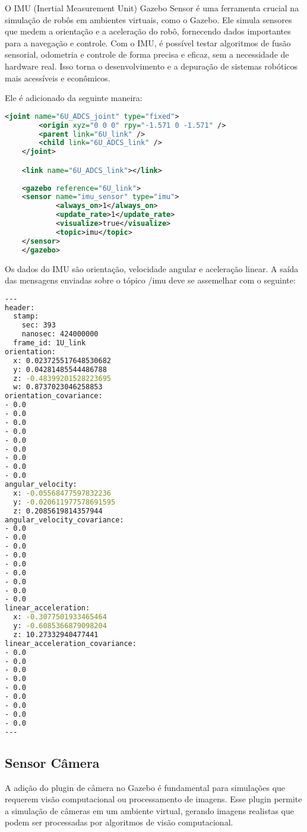 O IMU (Inertial Measurement Unit) Gazebo Sensor é uma ferramenta crucial na simulação de robôs em ambientes virtuais, como o Gazebo. Ele simula sensores que medem a orientação e a aceleração do robô, fornecendo dados importantes para a navegação e controle. Com o IMU, é possível testar algoritmos de fusão sensorial, odometria e controle de forma precisa e eficaz, sem a necessidade de hardware real. Isso torna o desenvolvimento e a depuração de sistemas robóticos mais acessíveis e econômicos.

Ele é adicionado da seguinte maneira:

\begin{lstlisting}[language=XML,caption={XML version}]
    <joint name="6U_ADCS_joint" type="fixed">
        <origin xyz="0 0 0" rpy="-1.571 0 -1.571" />
        <parent link="6U_link" />
        <child link="6U_ADCS_link" />
    </joint>

    <link name="6U_ADCS_link"></link>
    
    <gazebo reference="6U_link">
	<sensor name="imu_sensor" type="imu">
    		<always_on>1</always_on>
    		<update_rate>1</update_rate>
    		<visualize>true</visualize>
    		<topic>imu</topic>
	</sensor>
    </gazebo>
\end{lstlisting}

Os dados do IMU são orientação, velocidade angular e aceleração linear. A saída das mensagens enviadas sobre o tópico /imu deve se assemelhar com o seguinte:

\begin{lstlisting}[language=bash,caption={Bash version}]
    ---
header:
  stamp:
    sec: 393
    nanosec: 424000000
  frame_id: 1U_link
orientation:
  x: 0.023725517648530682
  y: 0.04281485544486788
  z: -0.48399201528223695
  w: 0.8737023046258853
orientation_covariance:
- 0.0
- 0.0
- 0.0
- 0.0
- 0.0
- 0.0
- 0.0
- 0.0
- 0.0
angular_velocity:
  x: -0.05568477597832236
  y: -0.020611977578691595
  z: 0.2085619814357944
angular_velocity_covariance:
- 0.0
- 0.0
- 0.0
- 0.0
- 0.0
- 0.0
- 0.0
- 0.0
- 0.0
linear_acceleration:
  x: -0.3077501933465464
  y: -0.6085366879098204
  z: 10.27332940477441
linear_acceleration_covariance:
- 0.0
- 0.0
- 0.0
- 0.0
- 0.0
- 0.0
- 0.0
- 0.0
- 0.0
---
\end{lstlisting}

\subsection{Sensor Câmera}

A adição do plugin de câmera no Gazebo é fundamental para simulações que requerem visão computacional ou processamento de imagens. Esse plugin permite a simulação de câmeras em um ambiente virtual, gerando imagens realistas que podem ser processadas por algoritmos de visão computacional.

